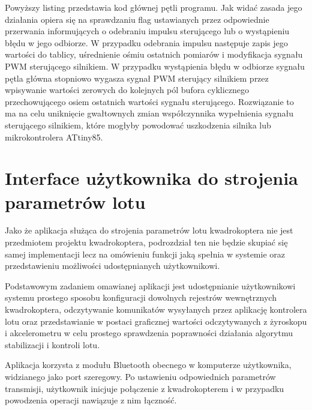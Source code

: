 Powyższy listing przedstawia kod głównej pętli programu. Jak widać zasada jego działania opiera się na sprawdzaniu flag ustawianych przez odpowiednie przerwania informujących o odebraniu impulsu sterującego lub o wystąpieniu błędu w jego odbiorze. W przypadku odebrania impulsu następuje zapis jego wartości do tablicy, uśrednienie ośmiu ostatnich pomiarów i modyfikacja sygnału PWM sterującego silnikiem. W przypadku wystąpienia błędu w odbiorze sygnału pętla główna stopniowo wygasza sygnał PWM sterujący silnikiem przez wpisywanie wartości zerowych do kolejnych pól bufora cyklicznego przechowującego osiem ostatnich wartości sygnału sterującego. Rozwiązanie to ma na celu uniknięcie gwałtownych zmian współczynnika wypełnienia sygnału sterującego silnikiem, które mogłyby powodować uszkodzenia silnika lub mikrokontrolera ATtiny85.

\section{Interface użytkownika do strojenia parametrów lotu}

Jako że aplikacja służąca do strojenia parametrów lotu kwadrokoptera nie jest przedmiotem projektu kwadrokoptera, podrozdział ten nie będzie skupiać się samej implementacji lecz na omówieniu funkcji jaką spełnia w systemie oraz przedstawieniu możliwości udostępnianych użytkownikowi. 

Podstawowym zadaniem omawianej aplikacji jest udostępnianie użytkownikowi systemu prostego sposobu konfiguracji dowolnych rejestrów wewnętrznych kwadrokoptera, odczytywanie komunikatów wysyłanych przez aplikację kontrolera lotu oraz przedstawianie w postaci graficznej wartości odczytywanych z żyroskopu i akcelerometru w celu prostego sprawdzenia poprawności działania algorytmu stabilizacji i kontroli lotu.

Aplikacja korzysta z modułu Bluetooth obecnego w komputerze użytkownika, widzianego jako port szeregowy. Po ustawieniu odpowiednich parametrów transmisji, użytkownik inicjuje połączenie z kwadrokopterem i w przypadku powodzenia operacji nawiązuje z nim łączność. 

